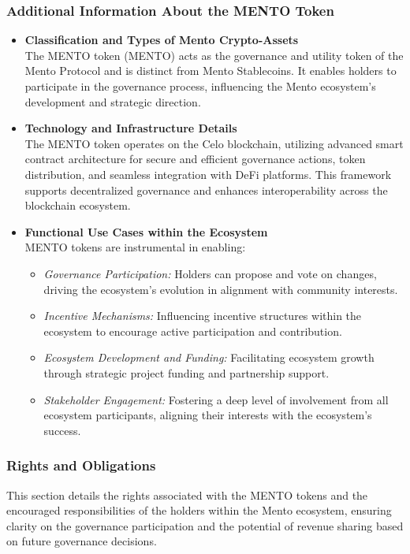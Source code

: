 \documentclass[a4paper]{article}
\theoremstyle{definition}
\begin{document}
\subsubsection{Additional Information About the MENTO Token}
\begin{itemize}
    \item \textbf{Classification and Types of Mento Crypto-Assets}\\
    The MENTO token (MENTO) acts as the governance and utility token of the Mento Protocol and is distinct from Mento Stablecoins. It enables holders to participate in the governance process, influencing the Mento ecosystem's development and strategic direction.

    \item \textbf{Technology and Infrastructure Details}\\
    The MENTO token operates on the Celo blockchain, utilizing advanced smart contract architecture for secure and efficient governance actions, token distribution, and seamless integration with DeFi platforms. This framework supports decentralized governance and enhances interoperability across the blockchain ecosystem.

    \item \textbf{Functional Use Cases within the Ecosystem}\\
    MENTO tokens are instrumental in enabling:
    \begin{itemize}
        \item \textit{Governance Participation:} Holders can propose and vote on changes, driving the ecosystem’s evolution in alignment with community interests.
        \item \textit{Incentive Mechanisms:} Influencing incentive structures within the ecosystem to encourage active participation and contribution.
        \item \textit{Ecosystem Development and Funding:} Facilitating ecosystem growth through strategic project funding and partnership support.
        \item \textit{Stakeholder Engagement:} Fostering a deep level of involvement from all ecosystem participants, aligning their interests with the ecosystem's success.
    \end{itemize}
\end{itemize}


\subsubsection{Rights and Obligations}
This section details the rights associated with the MENTO tokens and the encouraged responsibilities of the holders within the Mento ecosystem, ensuring clarity on the governance participation and the potential of revenue sharing based on future governance decisions.
\end{document}

